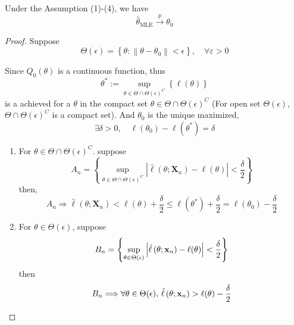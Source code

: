 \begin{theorem}
	Under the Assumption (1)-(4), we have
	\begin{equation}
		\hat{\theta}_{\text{MLE}}\stackrel{p}{\rightarrow}\theta_{0}
	\end{equation}
\end{theorem}

\begin{proof}
	Suppose
	\begin{equation*}
		\Theta(\epsilon)=\left\{\theta:\left\|\theta-\theta_{0}\right\|<\epsilon\right\},\quad\forall\varepsilon>0
	\end{equation*}

	Since $Q_{0}(\theta)$ is a continuous function, thus
	\begin{equation*}
		\theta^{*}:=\sup_{\theta\in\Theta\cap \Theta(\epsilon)^{C}}\left\{\ell(\theta)\right\}
	\end{equation*}
	is a achieved for a $\theta$ in the compact set $\theta\in\Theta\cap \Theta(\epsilon)^{C}$ (For open set $\Theta(\epsilon)$, $\Theta\cap\Theta(\epsilon)^{C}$ is a compact set). And $\theta_{0}$ is the unique maximized,
	\begin{equation*}
		\exists\delta>0,\quad\ell\left(\theta_{0}\right)-\ell\left(\theta^{*}\right)=\delta
	\end{equation*}

	\begin{enumerate}
		\item For $\theta\in\Theta\cap\Theta(\epsilon)^{C}$. suppose
		      \begin{equation}
			      A_{n}=\left\{\sup_{\theta\in\Theta\cap\Theta(\epsilon)^{C}}\left|\hat{\ell}\left(\theta;\textbf{X}_{n}\right)-\ell(\theta)\right|<\frac{\delta}{2}\right\}
		      \end{equation}
		      then,
		      \begin{equation}
			      A_{n}\Longrightarrow\hat{\ell}\left(\theta;\textbf{X}_{n}\right)<\ell(\theta)+\frac{\delta}{2}\leq \ell\left(\theta^{*}\right)+\frac{\delta}{2}=\ell\left(\theta_{0}\right)-\frac{\delta}{2}
		      \end{equation}
		\item For $\theta\in\Theta(\epsilon)$, suppose
		      \begin{equation}
			      B_{n}=\left\{\sup_{\theta\in\Theta(\epsilon)}\left|\hat{\ell}\left(\theta;{\bf x}_{n}\right)-\ell(\theta)\right|<\frac{\delta}{2}\right\}
		      \end{equation}
		      then
		      \begin{equation}
			      B_{n}\Longrightarrow\forall\theta\in\Theta(\epsilon),\,\hat{\ell}\left(\theta;{\bf x}_{n}\right)>\ell(\theta)-\frac{\delta}{2}
		      \end{equation}
	\end{enumerate}


\end{proof}
